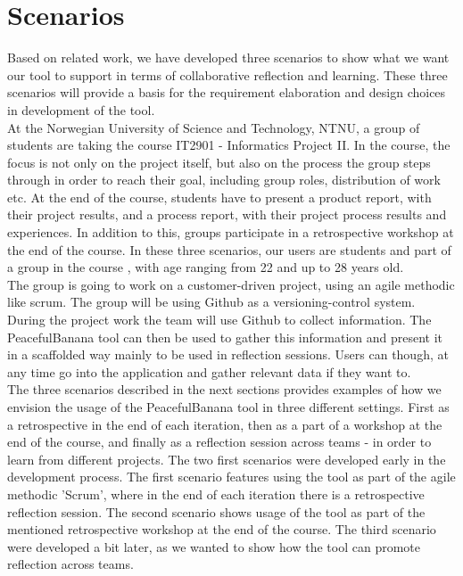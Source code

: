\section{Scenarios}
\label{problemdefinition}
Based on related work, we have developed three scenarios to show what we want our tool to support in terms of collaborative reflection and learning. These three scenarios will provide a basis for the requirement elaboration and design choices in development of the tool. 
\\
At the Norwegian University of Science and Technology, NTNU, a group of students are taking the course IT2901 - Informatics Project II\footnotemark.
In the course, the focus is not only on the project itself, but also on the process the group steps through in order to reach their goal, including group roles, distribution of work etc. At the end of the course, students have to present a product report, with their project results, and a process report, with their project process results and experiences. In addition to this, groups participate in a retrospective workshop at the end of the course. In these three scenarios, our users are students and part of a group in the course , with age ranging from 22 and up to 28 years old.
\\
The group is going to work on a customer-driven project, using an agile methodic like scrum. The group will be using Github as a versioning-control system. During the project work the team will use Github to collect information. The PeacefulBanana tool can then be used to gather this information and present it in a scaffolded way mainly to be used in reflection sessions. Users can though, at any time go into the application and gather relevant data if they want to. 
\\
The three scenarios described in the next sections provides examples of how we envision the usage of the PeacefulBanana tool in three different settings. First as a retrospective in the end of each iteration, then as a part of a workshop at the end of the course, and finally as a reflection session across teams - in order to learn from different projects. 
The two first scenarios were developed early in the development process. The first scenario features using the tool as part of the agile methodic 'Scrum', where in the end of each iteration there is a retrospective reflection session. The second scenario shows usage of the tool as part of the mentioned retrospective workshop at the end of the course. The third scenario were developed a bit later, as we wanted to show how the tool can promote reflection across teams. 
\\


